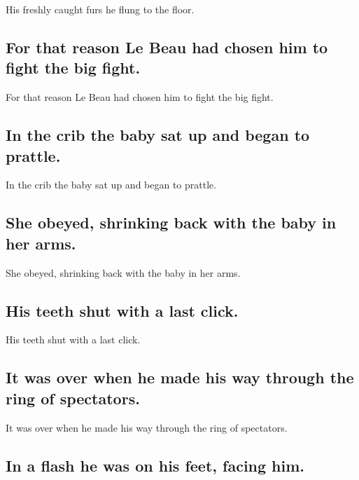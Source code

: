 \documentclass[]{article}
\begin{document}
His freshly caught furs he flung to the floor.

\hypertarget{for-that-reason-le-beau-had-chosen-him-to-fight-the-big-fight.}{%
\subsection{For that reason Le Beau had chosen him to fight the big
fight.}\label{for-that-reason-le-beau-had-chosen-him-to-fight-the-big-fight.}}

For that reason Le Beau had chosen him to fight the big fight.

\hypertarget{in-the-crib-the-baby-sat-up-and-began-to-prattle.}{%
\subsection{In the crib the baby sat up and began to
prattle.}\label{in-the-crib-the-baby-sat-up-and-began-to-prattle.}}

In the crib the baby sat up and began to prattle.

\hypertarget{she-obeyed-shrinking-back-with-the-baby-in-her-arms.}{%
\subsection{She obeyed, shrinking back with the baby in her
arms.}\label{she-obeyed-shrinking-back-with-the-baby-in-her-arms.}}

She obeyed, shrinking back with the baby in her arms.

\hypertarget{his-teeth-shut-with-a-last-click.}{%
\subsection{His teeth shut with a last
click.}\label{his-teeth-shut-with-a-last-click.}}

His teeth shut with a last click.

\hypertarget{it-was-over-when-he-made-his-way-through-the-ring-of-spectators.}{%
\subsection{It was over when he made his way through the ring of
spectators.}\label{it-was-over-when-he-made-his-way-through-the-ring-of-spectators.}}

It was over when he made his way through the ring of spectators.

\hypertarget{in-a-flash-he-was-on-his-feet-facing-him.}{%
\subsection{In a flash he was on his feet, facing
him.}\label{in-a-flash-he-was-on-his-feet-facing-him.}}
\end{document}
